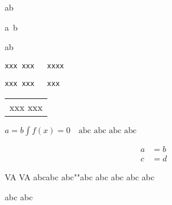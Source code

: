 \documentclass{article}
\begin{document}
ab

a~b

a\pdffakespace b

\begin{verbatim}
xxx xxx   xxxx
\end{verbatim}

\begin{lstlisting}
xxx xxx   xxx
\end{lstlisting}

\begin{tabular}{l}
xxx xxx
\end{tabular}

$a=b \int f(x) =0\quad  \text{abc abc abc abc} $

\begin{align}
a &=b \\
c &=d
\end{align}


VA VA abc\hspace{0pt}abc abc""abc
abc abc \sffamily abc abc
\lipsum[1]\tagmcend

\selectfont abc abc
\tagstructend
\end{document}
